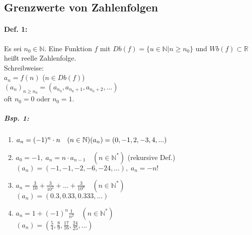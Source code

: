 \subsection{Grenzwerte von Zahlenfolgen}
\paragraph{Def. 1:} \parskp
Es sei $n_0 \in \mathbb{N}$. Eine Funktion $f$ mit $Db(f)=\{u\in \mathbb{N}|n\geq n_0\}$ und $Wb(f) \subset \mathbb{R}$ heißt reelle Zahlenfolge.\\
Schreibweise: \\
$a_n=f(n)$ \qquad ($n \in Db(f)$)\\
$\left(a_n\right)_{n\geq n_0}=\left(a_{n_0}, a_{n_0+1}, a_{n_0+2}, ...\right)$\\
oft $n_0=0$ oder $n_0=1$.
\subparagraph{Bsp. 1:} 
\begin{enumerate}[label=\alph*.)]
\item $a_n=(-1)^n\cdot n \quad (n \in \mathbb{N})\\
(a_n)=(0,-1,2,-3,4,...)$
\item $a_0=-1,\; a_n=n\cdot a_{n-1} \quad (n \in \mathbb{N}^*)$ \quad (rekursive Def.)\\
$(a_n)=(-1,-1,-2,-6,-24,...), \; a_n = -n!$
\item $a_n=\frac{3}{10}+\frac{3}{10^2}+...+\frac{3}{10^n} \quad (n\in \mathbb{N}^*)$\\
$(a_n)=(0.3, 0.33, 0.333, ... )$
\item $a_n=1+(-1)^n\frac{1}{n^2} \quad (n \in \mathbb{N}^*)$\\
$(a_n)=\left( \frac{5}{4}, \frac{8}{9}, \frac{17}{16}, \frac{24}{25},...\right)$
\end{enumerate}
